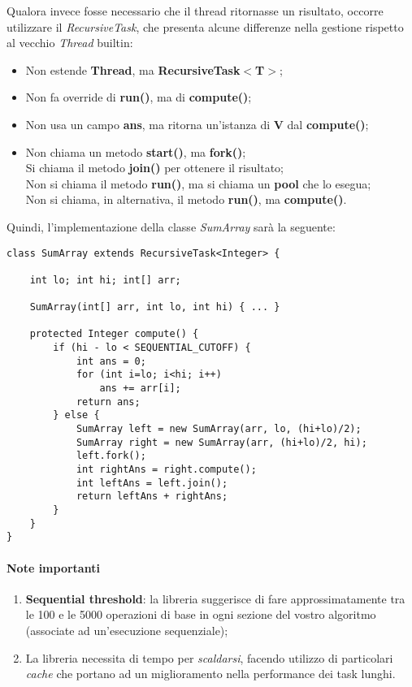 Qualora invece fosse necessario che il thread ritornasse un risultato, occorre utilizzare il \textit{RecursiveTask}, che presenta alcune differenze nella gestione rispetto al vecchio \textit{Thread} builtin:
\begin{itemize}
	\item Non estende \textbf{Thread}, ma \textbf{RecursiveTask$<$T$>$};
	\item Non fa override di \textbf{run()}, ma di \textbf{compute()};
	\item Non usa un campo \textbf{ans}, ma ritorna un'istanza di \textbf{V} dal \textbf{compute()};
	\item Non chiama un metodo \textbf{start()}, ma \textbf{fork()}; \\
	\textit{}Si chiama il metodo \textbf{join()} per ottenere il risultato; \\
	\textit{}Non si chiama il metodo \textbf{run()}, ma si chiama un \textbf{pool} che lo esegua; \\
	\textit{}Non si chiama, in alternativa, il metodo \textbf{run()}, ma \textbf{compute()}.
\end{itemize}

\newpage

Quindi, l'implementazione della classe \textit{SumArray} sarà la seguente:
\begin{lstlisting}
class SumArray extends RecursiveTask<Integer> {

	int lo; int hi; int[] arr;

	SumArray(int[] arr, int lo, int hi) { ... }
	
	protected Integer compute() {
		if (hi - lo < SEQUENTIAL_CUTOFF) {
			int ans = 0;
			for (int i=lo; i<hi; i++)
				ans += arr[i];
			return ans;
		} else {
			SumArray left = new SumArray(arr, lo, (hi+lo)/2);
			SumArray right = new SumArray(arr, (hi+lo)/2, hi);
			left.fork();
			int rightAns = right.compute();
			int leftAns = left.join();
			return leftAns + rightAns;
		}
	}
}
\end{lstlisting}

\paragraph{Note importanti}
\begin{enumerate}
	\item \textbf{Sequential threshold}: la libreria suggerisce di fare approssimatamente tra le 100 e le 5000 operazioni di base in ogni sezione del vostro algoritmo (associate ad un'esecuzione sequenziale);
	\item La libreria necessita di tempo per \textit{scaldarsi}, facendo utilizzo di particolari \textit{cache} che portano ad un miglioramento nella performance dei task lunghi.
\end{enumerate}

